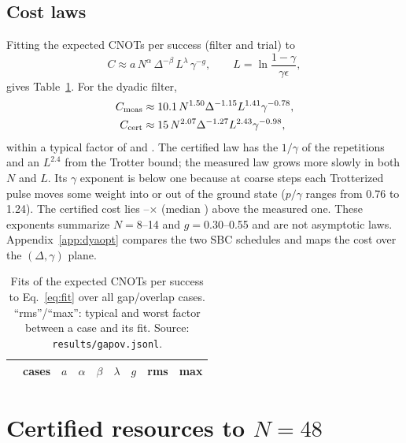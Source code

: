 \documentclass[aps,pra,twocolumn,superscriptaddress,nofootinbib]{revtex4-2}
\begin{document}
\subsection{Cost laws}

Fitting the expected CNOTs per success (filter and trial) to
\begin{equation}
C\approx a\,N^{\alpha}\,\Delta^{-\beta}\,L^{\lambda}\,\gamma^{-g},\qquad L=\ln\frac{1-\gamma}{\gamma\epsilon},
\label{eq:fit}
\end{equation}
gives Table~\ref{tab:gofit}. For the dyadic filter,
\begin{align}
C_{\rm meas}&\approx10.1\,N^{1.50}\Delta^{-1.15}L^{1.41}\gamma^{-0.78},\\
C_{\rm cert}&\approx15\,N^{2.07}\Delta^{-1.27}L^{2.43}\gamma^{-0.98},
\end{align}
within a typical factor of \goMDrms{} and \goCDrms. The certified law has the $1/\gamma$ of the repetitions and an
$L^{2.4}$ from the Trotter bound; the measured law grows more slowly in both $N$ and $L$. Its $\gamma$ exponent is
below one because at coarse steps each Trotterized pulse moves some weight into or out of the ground state
($p/\gamma$ ranges from 0.76 to 1.24). The certified cost lies \goCertRatioMin--\goCertRatioMax$\times$ (median
\goCertRatioMed) above the measured one. These exponents summarize $N=8$--14 and $g=0.30$--0.55 and are not
asymptotic laws. Appendix~\ref{app:dyaopt} compares the two SBC schedules and maps the cost over the
$(\Delta,\gamma)$ plane.

\begin{table}[t]
\caption{Fits of the expected CNOTs per success to Eq.~\eqref{eq:fit} over all \goNcases{} gap/overlap
cases. ``rms''/``max'': typical and worst factor between a case and its fit. Source:
\texttt{results/gapov.jsonl}.}
\label{tab:gofit}
\begin{ruledtabular}
\begin{tabular}{lrrrrrrrr}
 & cases & $a$ & $\alpha$ & $\beta$ & $\lambda$ & $g$ & rms & max\\
\midrule

\end{tabular}
\end{ruledtabular}
\end{table}

\section{Certified resources to $N=48$}
\label{sec:regime}
\end{document}
